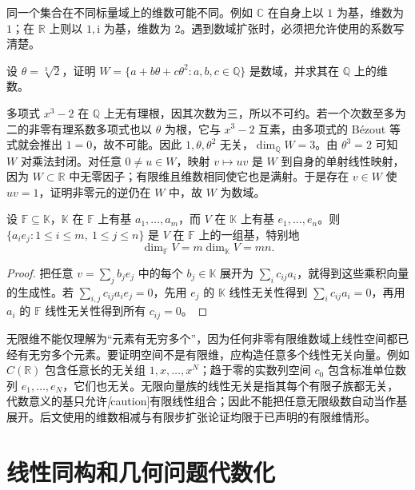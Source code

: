 同一个集合在不同标量域上的维数可能不同。例如 $\mathbb C$ 在自身上以 $1$ 为基，维数为 $1$；在 $\mathbb R$ 上则以 $1,\mathrm i$ 为基，维数为 $2$。遇到数域扩张时，必须把允许使用的系数写清楚。

\begin{example}
\label{ex:laex-cubic-field}
设 $\theta=\sqrt[3]{2}$，证明 $W=\{a+b\theta+c\theta^2:a,b,c\in\mathbb Q\}$ 是数域，并求其在 $\mathbb Q$ 上的维数。
\end{example}

\begin{solve}
多项式 $x^3-2$ 在 $\mathbb Q$ 上无有理根，因其次数为三，所以不可约。若一个次数至多为二的非零有理系数多项式也以 $\theta$ 为根，它与 $x^3-2$ 互素，由多项式的 Bézout 等式就会推出 $1=0$，故不可能。因此 $1,\theta,\theta^2$ 无关，$\dim_{\mathbb Q}W=3$。由 $\theta^3=2$ 可知 $W$ 对乘法封闭。对任意 $0\ne u\in W$，映射 $v\mapsto uv$ 是 $W$ 到自身的单射线性映射，因为 $W\subset\mathbb R$ 中无零因子；有限维且维数相同使它也是满射。于是存在 $v\in W$ 使 $uv=1$，证明非零元的逆仍在 $W$ 中，故 $W$ 为数域。
\end{solve}

\begin{proposition}
\label{prop:laex-scalar-restriction}
设 $\mathbb F\subseteq\mathbb K$，$\mathbb K$ 在 $\mathbb F$ 上有基 $a_1,\ldots,a_m$，而 $V$ 在 $\mathbb K$ 上有基 $e_1,\ldots,e_n$。则 $\{a_ie_j:1\le i\le m,\ 1\le j\le n\}$ 是 $V$ 在 $\mathbb F$ 上的一组基，特别地
\[
\dim_{\mathbb F}V=m\dim_{\mathbb K}V=mn.
\]
\end{proposition}

\begin{proof}
把任意 $v=\sum_j b_je_j$ 中的每个 $b_j\in\mathbb K$ 展开为 $\sum_i c_{ij}a_i$，就得到这些乘积向量的生成性。若 $\sum_{i,j}c_{ij}a_ie_j=0$，先用 $e_j$ 的 $\mathbb K$ 线性无关性得到 $\sum_i c_{ij}a_i=0$，再用 $a_i$ 的 $\mathbb F$ 线性无关性得到所有 $c_{ij}=0$。
\end{proof}

无限维不能仅理解为“元素有无穷多个”，因为任何非零有限维数域上线性空间都已经有无穷多个元素。要证明空间不是有限维，应构造任意多个线性无关向量。例如 $C(\mathbb R)$ 包含任意长的无关组 $1,x,\ldots,x^N$；趋于零的实数列空间 $c_0$ 包含标准单位数列 $e_1,\ldots,e_N$，它们也无关。无限向量族的线性无关是指其每个有限子族都无关，代数意义的基只允许\emph[caution]{有限线性组合}；因此不能把任意无限级数自动当作基展开。后文使用的维数相减与有限步扩张论证均限于已声明的有限维情形。

\section{线性同构和几何问题代数化}
\label{sec:laex-isomorphism}

